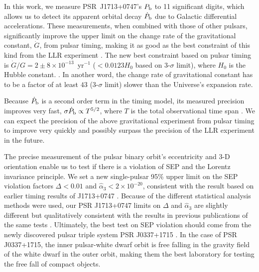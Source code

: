 In this work, we measure PSR~J1713+0747's $P_{\rm b}$ to 11 significant
digits, which allows us to detect its apparent orbital decay $\dot{P}_{\rm b}$ due to Galactic differential accelerations.
These measurements, when combined with those of other pulsars, 
significantly improve the upper limit on the change rate of the gravitational
 constant, $\dot{G}$, from pulsar timing, making it as good as the best
constraint of this kind from the LLR experiment \citep{hmb10}.
The new best constraint based on pulsar timing is $\dot{G}/G
=2\pm8\times10^{-13}$~yr$^{-1}$ ($<0.0123H_0$ based on 3-$\sigma$ limit), where $H_0$ is the Hubble constant. . 
In another word, the change rate of gravitational constant has to be a factor
of at least $43$ (3-$\sigma$ limit) slower than the Universe's expansion rate.

Because $\dot P_{\rm b}$ is a second order term in the timing 
model, its measured precision improves very fast, $\sigma \dot
P_{\rm b} \propto T^{5/2}$, where $T$ is the total observational time
span \cite{dt92}.
We can expect the precision of the above gravitational experiment from pulsar
timing to improve very quickly and possibly surpass the precision
of the LLR
experiment in the future.

The precise measurement of the pulsar binary orbit's eccentricity and
3-D orientation enable us to test if there is a violation of SEP and the
Lorentz invariance principle. We set a new single-pulsar 95\% upper limit on the SEP violation
factors $\Delta <0.01$ and $\hat{\alpha}_3<2\times10^{-20}$, consistent with
the result \citep{gsf+11} based on earlier timing results of J1713+0747 
\citep{sns+05}.
Because of the different statistical analysis methods were used, our PSR
J1713+0747 limits on $\Delta$ and $\hat{\alpha}_3$ are slightly
different but qualitatively consistent with the results in previous publications of the same tests  \citep{wex00, sns+05, sfl+05, gsf+11}.
Ultimately, the best test on SEP violation should come from the newly
discovered pulsar triple system PSR J0337+1715 \citep{rsa+14}. In the case of
PSR J0337+1715, the
inner pulsar-white dwarf orbit is free falling in the gravity field of the
white dwarf in the outer orbit, making them the best laboratory for testing
the free fall of compact objects.



